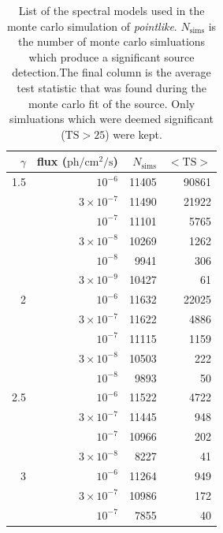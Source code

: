 \documentclass[preprint]{aastex}
\newcommand{\pointlike}{{\em pointlike}}
\begin{document}
\begin{table}
  \begin{centering}
\begin{tabular}{ | r | r | r | r | }
\hline
$\gamma$ & flux ($\text{ph}/\text{cm}^2/\text{s}$) & $N_\text{sims}$ & $<\text{TS}>$ \\
\hline
  1.5 &          $10^{-6}$ &           11405 &  90861 \\
      &  $3\times 10^{-7}$ &           11490 &  21922 \\
      &          $10^{-7}$ &           11101 &   5765 \\
      &  $3\times 10^{-8}$ &           10269 &   1262 \\
      &          $10^{-8}$ &            9941 &    306 \\
      &  $3\times 10^{-9}$ &           10427 &     61 \\
\hline
    2 &          $10^{-6}$ &           11632 &  22025 \\
      &  $3\times 10^{-7}$ &           11622 &   4886 \\
      &          $10^{-7}$ &           11115 &   1159 \\
      &  $3\times 10^{-8}$ &           10503 &    222 \\
      &          $10^{-8}$ &            9893 &     50 \\
\hline
  2.5 &          $10^{-6}$ &           11522 &   4722 \\
      &  $3\times 10^{-7}$ &           11445 &    948 \\
      &          $10^{-7}$ &           10966 &    202 \\
      &  $3\times 10^{-8}$ &            8227 &     41 \\
\hline                                                
    3 &          $10^{-6}$ &           11264 &    949 \\
      &  $3\times 10^{-7}$ &           10986 &    172 \\
      &          $10^{-7}$ &            7855 &     40 \\
\hline
\end{tabular}
\caption{List of the spectral models used in the monte carlo simulation of
\pointlike. $N_\text{sims}$ is the number of monte carlo simluations
which produce a significant source detection.The final column is the
average test statistic that was found during the monte carlo fit of
the source. Only simluations which were deemed significant ($\text{TS}>25$)
were kept.}
\label{ts_ext_num_sims}
  \end{centering}
\end{table}
\end{document}
